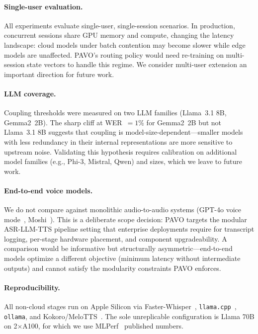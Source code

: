 \documentclass{article}
\begin{document}
\paragraph{Single-user evaluation.} All experiments evaluate single-user, single-session scenarios. In production, concurrent sessions share GPU memory and compute, changing the latency landscape: cloud models under batch contention may become slower while edge models are unaffected. PAVO's routing policy would need re-training on multi-session state vectors to handle this regime. We consider multi-user extension an important direction for future work.

\paragraph{LLM coverage.} Coupling thresholds were measured on two LLM families (Llama~3.1 8B, Gemma2~2B). The sharp cliff at WER~$=1\%$ for Gemma2~2B but not Llama~3.1 8B suggests that coupling is model-size-dependent---smaller models with less redundancy in their internal representations are more sensitive to upstream noise. Validating this hypothesis requires calibration on additional model families (e.g., Phi-3, Mistral, Qwen) and sizes, which we leave to future work.

\paragraph{End-to-end voice models.} We do not compare against monolithic audio-to-audio systems (GPT-4o voice mode~\citep{openai2024gpt4o}, Moshi~\citep{defossez2024moshi}). This is a deliberate scope decision: PAVO targets the modular ASR-LLM-TTS pipeline setting that enterprise deployments require for transcript logging, per-stage hardware placement, and component upgradeability. A comparison would be informative but structurally asymmetric---end-to-end models optimize a different objective (minimum latency without intermediate outputs) and cannot satisfy the modularity constraints PAVO enforces.

\paragraph{Reproducibility.}
\label{sec:macbook}
All non-cloud stages run on Apple Silicon via Faster-Whisper~\citep{radford2023whisper}, \texttt{llama.cpp}~\citep{dubey2024llama3,frantar2022gptq}, \texttt{ollama}, and Kokoro/MeloTTS~\citep{kong2020hifigan,casanova2022yourtts}. The sole unreplicable configuration is Llama 70B on 2$\times$A100, for which we use MLPerf~\citep{mlperf2025} published numbers.
\end{document}
